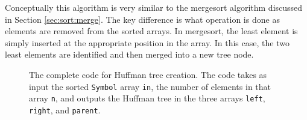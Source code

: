 \begin{aside}
Conceptually this algorithm is very similar to the mergesort algorithm discussed in Section \ref{sec:sort:merge}.   The key difference is what operation is done as elements are removed from the sorted arrays.  In mergesort, the least element is simply inserted at the appropriate position in the array.  In this case, the two least elements are identified and then merged into a new tree node.
\end{aside}

\begin{figure}

\end{figure}
\begin{figure}

\end{figure}
\begin{figure}

\caption{  The complete code for Huffman tree creation. The code takes as input the sorted \lstinline{Symbol} array \lstinline{in}, the number of elements in that array \lstinline{n}, and outputs the Huffman tree in the three arrays \lstinline{left}, \lstinline{right}, and \lstinline{parent}. }
\label{fig:huffman_create_tree.cpp}
\end{figure}

